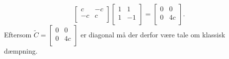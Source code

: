 \begin{derivation}
\[\begin{bmatrix}
    c & -c\\
    -c & c\\
    \end{bmatrix} \begin{bmatrix}
    1 & 1\\
    1 & -1\\
    \end{bmatrix} = \begin{bmatrix}
    0 & 0\\
    0 & 4c\\
    \end{bmatrix}
  .\]
  Eftersom $\tilde{C} = \begin{bmatrix}
  0 & 0\\
  0 & 4c\\
  \end{bmatrix}$ er diagonal må der derfor være tale om klassisk dæmpning.
\end{derivation}

